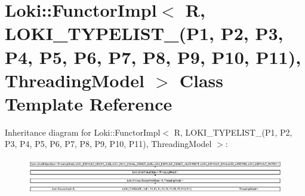\hypertarget{classLoki_1_1FunctorImpl_3_01R_00_01_01_01_01_01_01_01_01_01_01_01_01_01_01_01_01_01_01_01_01_012cc17e10e293e3d42873c3bf9f251a40}{}\section{Loki\+:\+:Functor\+Impl$<$ R, L\+O\+K\+I\+\_\+\+T\+Y\+P\+E\+L\+I\+S\+T\+\_(P1, P2, P3, P4, P5, P6, P7, P8, P9, P10, P11), Threading\+Model $>$ Class Template Reference}
\label{classLoki_1_1FunctorImpl_3_01R_00_01_01_01_01_01_01_01_01_01_01_01_01_01_01_01_01_01_01_01_01_012cc17e10e293e3d42873c3bf9f251a40}
Inheritance diagram for Loki\+:\+:Functor\+Impl$<$ R, L\+O\+K\+I\+\_\+\+T\+Y\+P\+E\+L\+I\+S\+T\+\_(P1, P2, P3, P4, P5, P6, P7, P8, P9, P10, P11), Threading\+Model $>$\+:\begin{figure}[H]
\begin{center}
\leavevmode
\includegraphics[height=1.614996cm]{classLoki_1_1FunctorImpl_3_01R_00_01_01_01_01_01_01_01_01_01_01_01_01_01_01_01_01_01_01_01_01_012cc17e10e293e3d42873c3bf9f251a40}
\end{center}
\end{figure}
